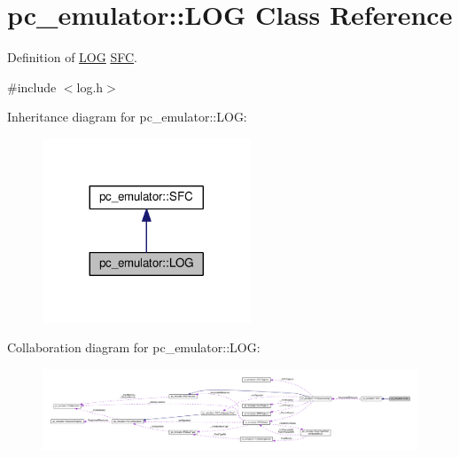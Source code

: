 \hypertarget{classpc__emulator_1_1LOG}{}\section{pc\+\_\+emulator\+:\+:L\+OG Class Reference}
\label{classpc__emulator_1_1LOG}


Definition of \hyperlink{classpc__emulator_1_1LOG}{L\+OG} \hyperlink{classpc__emulator_1_1SFC}{S\+FC}.  




{\ttfamily \#include $<$log.\+h$>$}



Inheritance diagram for pc\+\_\+emulator\+:\+:L\+OG\+:
\nopagebreak
\begin{figure}[H]
\begin{center}
\leavevmode
\includegraphics[width=176pt]{classpc__emulator_1_1LOG__inherit__graph}
\end{center}
\end{figure}


Collaboration diagram for pc\+\_\+emulator\+:\+:L\+OG\+:
\nopagebreak
\begin{figure}[H]
\begin{center}
\leavevmode
\includegraphics[width=350pt]{classpc__emulator_1_1LOG__coll__graph}
\end{center}
\end{figure}
